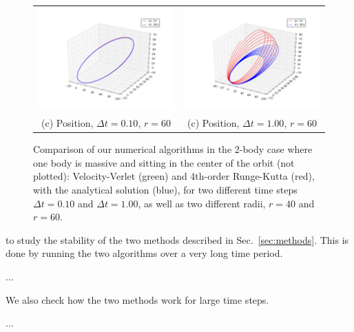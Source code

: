 \documentclass{article}
\begin{document}
\begin{multicols}{2}
\begin{figure}
\begin{center}
\begin{tabular}{cc}
	 \includegraphics[width=90mm]{Images/comparison_orbit_01_dist60.png}
	& \includegraphics[width=90mm]{Images/comparison_orbit_1_dist60.png} \\
	(c) Position, $\Delta t = 0.10$, $r = 60$				& (c) Position, $\Delta t = 1.00$, $r = 60$  \\[6pt]
\end{tabular}
\caption{Comparison of our numerical algorithms in the 2-body case where one body is massive and sitting in the center of the orbit (not plotted): Velocity-Verlet (green) and 4th-order Runge-Kutta (red), with the analytical solution (blue), for two different time steps $\Delta t = 0.10$ and $\Delta t = 1.00$, as well as two different radii, $r = 40$ and $r = 60$.}\label{fig:2_body}
\end{center}
\end{figure}

 to study the stability of the two methods described in Sec.~\ref{sec:methods}. This is done by running the two algorithms over a very long time period. 

...

We also check how the two methods work for large time steps.

...




\end{multicols}
\end{document}

